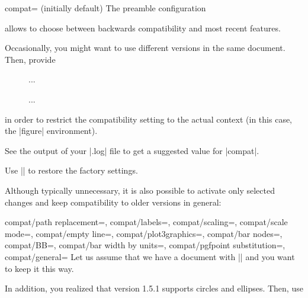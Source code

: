 \begin{pgfplotskey}{compat= (initially default)}
	The preamble configuration 
\begin{codeexample}
\usepackage{pgfplots}
\pgfplotsset{compat=1.13}
\end{codeexample}
	allows to choose between backwards compatibility and most recent features.

	Occasionally, you might want to use different versions in the same document. Then, provide
\begin{codeexample}
\begin{figure}
	\pgfplotsset{compat=1.4}
	...
	\caption{...}
\end{figure}
\end{codeexample}
	\noindent in order to restrict the compatibility setting to the actual context (in this case, the |figure| environment).

	See the output of your |.log| file to get a suggested value for |compat|.

	Use |\pgfplotsset{compat=default}| to restore the factory settings.

	Although typically unnecessary, it is also possible to activate only selected changes and keep compatibility to older versions in general:
	\begin{pgfplotskeylist}{%
		compat/path replacement=,%
		compat/labels=,%
		compat/scaling=,%
		compat/scale mode=,%
		compat/empty line=,%
		compat/plot3graphics=,%
		compat/bar nodes=,%
		compat/BB=,%
		compat/bar width by units=,%
		compat/pgfpoint substitution=,%
		compat/general=%
	}
	Let us assume that we have a document with |\pgfplotsset{compat=1.3}| and you want to keep it this way.

	In addition, you realized that version 1.5.1 supports circles and ellipses. Then, use
\begin{codeexample}[]
\pgfplotsset{compat=1.3,compat/path replacement=1.5.1}
\end{codeexample}
	

\end{pgfplotskeylist}
\end{pgfplotskey}
